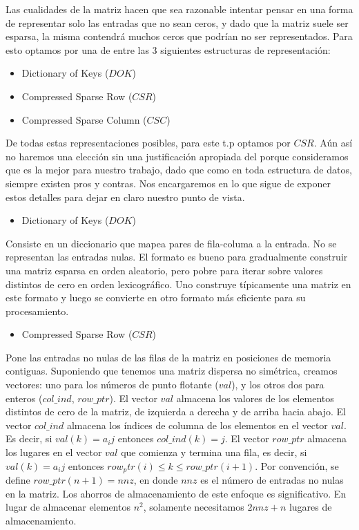 Las cualidades de la matriz hacen que sea razonable intentar pensar en una forma de representar solo las entradas que no sean ceros, y dado que la matriz suele ser esparsa, la misma contendrá muchos ceros que podrían no ser representados. Para esto optamos por una de entre las 3 siguientes estructuras de representación:

\begin{itemize}
\item Dictionary of Keys ($DOK$)

\item Compressed Sparse Row ($CSR$)

\item Compressed Sparse Column ($CSC$)
\end{itemize}

De todas estas representaciones posibles, para este t.p optamos por $CSR$. Aún así no haremos una elección sin una justificación apropiada del porque consideramos que es la mejor para nuestro trabajo, dado que como en toda estructura de datos, siempre existen pros y contras. Nos encargaremos en lo que sigue de exponer estos detalles para dejar en claro nuestro punto de vista. 

\begin{itemize}
\item Dictionary of Keys ($DOK$)
\end{itemize}
Consiste en un diccionario que mapea pares de fila-columa a la entrada. No se representan las entradas nulas. El formato es bueno para gradualmente construir una matriz esparsa en orden aleatorio, pero pobre para iterar sobre valores distintos de cero en orden lexicográfico. Uno construye típicamente una matriz en este formato y luego se convierte en otro formato más eficiente para su procesamiento.

\begin{itemize}
\item Compressed Sparse Row ($CSR$)
\end{itemize}
Pone las entradas no nulas de las filas de la matriz en posiciones de memoria contiguas. Suponiendo que tenemos una matriz dispersa no simétrica, creamos vectores: uno para los números de punto flotante ($val$), y los otros dos para enteros ($col\_ind$, $row\_ptr$). El vector $val$ almacena los valores de los elementos distintos de cero de la matriz, de izquierda a derecha y de arriba hacia abajo. El vector $col\_ind$ almacena los índices de columna de los elementos en el vector $val$. Es decir, si $val(k) = a_ij$ entonces $col\_ind(k) = j$. El vector $row\_ptr$ almacena los lugares en el vector $val$ que comienza y termina una fila, es decir, si $val(k) = a_ij$ entonces $row_ptr(i) \leq k \leq row\_ptr(i+1)$. Por convención, se define $row\_ptr(n+1) = nnz$, en donde $nnz$ es el número de entradas no nulas en la matriz. Los ahorros de almacenamiento de este enfoque es significativo. En lugar de almacenar elementos $n^2$, solamente necesitamos $2nnz + n$ lugares de almacenamiento.

